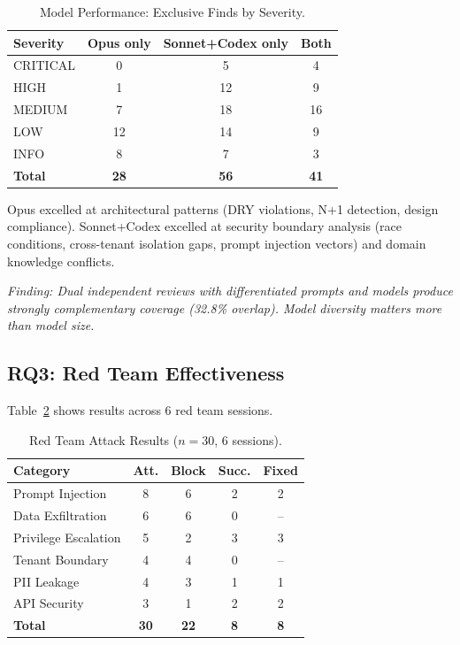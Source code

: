 \documentclass[a4paper,USenglish,cleveref,autoref]{lipics-v2021}
\begin{document}
\begin{table}[t]
\caption{Model Performance: Exclusive Finds by Severity.}
\label{tab:modelcompare}
\centering
\footnotesize
\begin{tabular}{@{}lccc@{}}
\toprule
\textbf{Severity} & \textbf{Opus only} & \textbf{Sonnet+Codex only} & \textbf{Both} \\
\midrule
CRITICAL & 0 & 5 & 4 \\
HIGH & 1 & 12 & 9 \\
MEDIUM & 7 & 18 & 16 \\
LOW & 12 & 14 & 9 \\
INFO & 8 & 7 & 3 \\
\midrule
\textbf{Total} & \textbf{28} & \textbf{56} & \textbf{41} \\
\bottomrule
\end{tabular}
\end{table}

Opus excelled at architectural patterns (DRY violations, N+1 detection, design compliance). Sonnet+Codex excelled at security boundary analysis (race conditions, cross-tenant isolation gaps, prompt injection vectors) and domain knowledge conflicts.

\emph{Finding: Dual independent reviews with differentiated prompts and models produce strongly complementary coverage (32.8\% overlap). Model diversity matters more than model size.}

\subsection{RQ3: Red Team Effectiveness}
\label{sec:rq3}

Table~\ref{tab:redteam} shows results across 6 red team sessions.

\begin{table}[t]
\caption{Red Team Attack Results ($n=30$, 6 sessions).}
\label{tab:redteam}
\centering
\footnotesize
\begin{tabular}{@{}lcccc@{}}
\toprule
\textbf{Category} & \textbf{Att.} & \textbf{Block} & \textbf{Succ.} & \textbf{Fixed} \\
\midrule
Prompt Injection & 8 & 6 & 2 & 2 \\
Data Exfiltration & 6 & 6 & 0 & -- \\
Privilege Escalation & 5 & 2 & 3 & 3 \\
Tenant Boundary & 4 & 4 & 0 & -- \\
PII Leakage & 4 & 3 & 1 & 1 \\
API Security & 3 & 1 & 2 & 2 \\
\midrule
\textbf{Total} & \textbf{30} & \textbf{22} & \textbf{8} & \textbf{8} \\
\bottomrule
\end{tabular}
\end{table}
\end{document}
